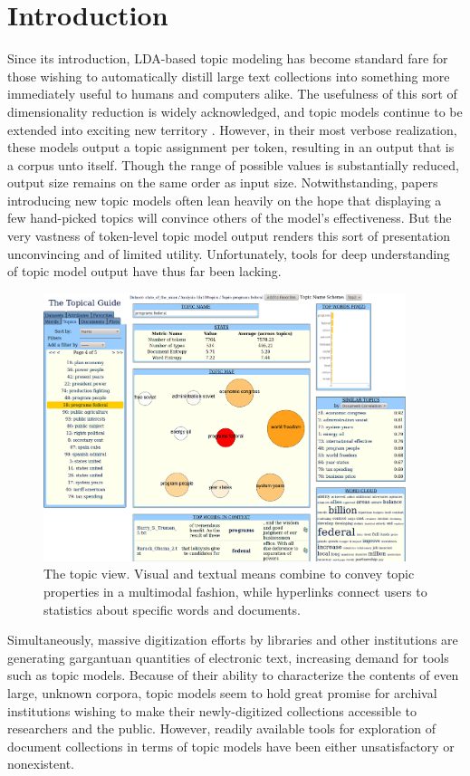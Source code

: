 \documentclass[11pt]{article}
\begin{document}
\section{Introduction}
Since its introduction, LDA-based topic modeling \cite{blei_latent_2003} has
become standard fare for those wishing to automatically distill large text
collections into something more immediately useful to humans and computers
alike. The usefulness of this sort of dimensionality reduction is widely
acknowledged, and topic models continue to be extended into exciting new
territory
\cite{wang_continuous_2008,mimno_polylingual_2009,brody_unsupervised_2010}.
However, in their most verbose realization, these models output a topic
assignment per token, resulting in an output that is a corpus unto itself.
Though the range of possible values is substantially reduced, output size
remains on the same order as input size. Notwithstanding, papers introducing new
topic models often lean heavily on the hope that displaying a few hand-picked
topics will convince others of the model's effectiveness. But the very vastness
of token-level topic model output renders this sort of presentation unconvincing
and of limited utility. Unfortunately, tools for deep understanding of topic model output have thus far
been lacking.
\begin{figure}[t]
 \centering
 \includegraphics[width=400px,keepaspectratio=true]{./topic_page_take5_2.png}
 \caption{The topic view. Visual and textual means combine to convey topic properties in a multimodal fashion,
while hyperlinks connect users to statistics about specific words and documents.}
 \label{fig:topic_page}
\end{figure}

Simultaneously, massive digitization efforts by libraries and other institutions
are generating gargantuan quantities of electronic text, increasing demand for tools such as
topic models. Because of their ability to characterize the contents of even large, unknown
corpora, topic models seem to hold great promise for archival
institutions wishing to make their newly-digitized collections accessible to
researchers and the public. However, readily available tools for exploration of 
document collections in terms of topic models have been either unsatisfactory
or nonexistent.
\end{document}
